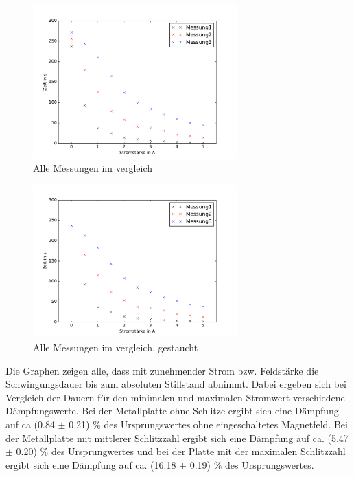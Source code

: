 \begin{figure}
  \centering
  \includegraphics[width=0.7\textwidth]{Kombiniert.pdf}
  \caption{Alle Messungen im vergleich}
  \label{fig:Kombiniert}
\end{figure}

\begin{figure}
  \centering
  \includegraphics[width=0.7\textwidth]{Kombiniert_gestaucht.pdf}
  \caption{Alle Messungen im vergleich, gestaucht}
  \label{fig:Kombiniert}
\end{figure}

Die Graphen zeigen alle, dass mit zunehmender Strom bzw. Feldstärke die Schwingungsdauer
bis zum absoluten Stillstand abnimmt. Dabei ergeben sich bei Vergleich der Dauern
für den minimalen und maximalen Stromwert verschiedene Dämpfungswerte.
Bei der Metallplatte ohne Schlitze ergibt sich eine Dämpfung auf ca (0.84 $\pm$ 0.21)
$\%$ des Ursprungswertes ohne eingeschaltetes Magnetfeld.
Bei der Metallplatte mit mittlerer Schlitzzahl ergibt sich eine Dämpfung auf
ca. (5.47 $\pm$ 0.20) $\%$ des Ursprungwertes und bei der Platte mit der maximalen
Schlitzzahl ergibt sich eine Dämpfung auf ca. (16.18 $\pm$ 0.19) $\%$ des
Ursprungswertes.

